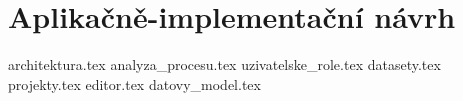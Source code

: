 \chapter{Aplikačně-implementační návrh}

{architektura.tex}
{analyza_procesu.tex}
{uzivatelske_role.tex}
{datasety.tex}
{projekty.tex}
{editor.tex}
{datovy_model.tex}